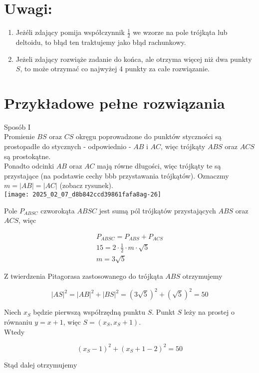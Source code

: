 \documentclass[10pt]{article}
\begin{document}
\section*{Uwagi:}
\begin{enumerate}
  \item Jeżéli zdający pomija współczynnik $\frac{1}{2}$ we wzorze na pole trójkąta lub deltoidu, to błąd ten traktujemy jako błąd rachunkowy.
  \item Jeżeli zdający rozwiąże zadanie do końca, ale otrzyma więcej niż dwa punkty $S$, to może otrzymać co najwyżej 4 punkty za całe rozwiązanie.
\end{enumerate}

\section*{Przykładowe pełne rozwiązania}
Sposób I\\
Promienie $B S$ oraz $C S$ okręgu poprowadzone do punktów styczności są prostopadłe do stycznych - odpowiednio - $A B$ i $A C$, więc trójkąty $A B S$ oraz $A C S$ są prostokątne.\\
Ponadto odcinki $A B$ oraz $A C$ mają równe długości, więc trójkąty te są przystające (na podstawie cechy bbb przystawania trójkątów). Oznaczmy $m=|A B|=|A C|$ (zobacz rysunek).\\
\texttt{[image: 2025\_02\_07\_d8b842ccd39861fafa8ag-26]}

Pole $P_{A B S C}$ czworokąta $A B S C$ jest sumą pól trójkątów przystających $A B S$ oraz $A C S$, więc

$$
\begin{gathered}
P_{A B S C}=P_{A B S}+P_{A C S} \\
15=2 \cdot \frac{1}{2} \cdot m \cdot \sqrt{5} \\
m=3 \sqrt{5}
\end{gathered}
$$

Z twierdzenia Pitagorasa zastosowanego do trójkąta $A B S$ otrzymujemy

$$
|A S|^{2}=|A B|^{2}+|B S|^{2}=(3 \sqrt{5})^{2}+(\sqrt{5})^{2}=50
$$

Niech $x_{S}$ będzie pierwszą współrzędną punktu $S$. Punkt $S$ leży na prostej o równaniu $y=x+1$, więc $S=\left(x_{S}, x_{S}+1\right)$.\\
Wtedy

$$
\left(x_{S}-1\right)^{2}+\left(x_{S}+1-2\right)^{2}=50
$$

Stąd dalej otrzymujemy
\end{document}
